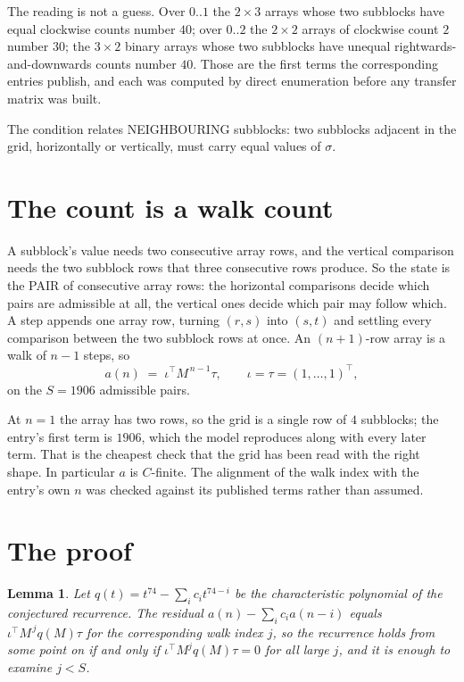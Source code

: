 \documentclass[11pt,a4paper]{article}
\theoremstyle{plain}
\newtheorem{lemma}[theorem]{Lemma}
\theoremstyle{definition}
\begin{document}
The reading is not a guess. Over $0..1$ the $2\times3$ arrays whose two subblocks have equal
clockwise counts number $40$; over $0..2$ the $2\times2$ arrays of clockwise count $2$ number
$30$; the $3\times2$ binary arrays whose two subblocks have unequal rightwards-and-downwards
counts number $40$. Those are the first terms the corresponding entries publish, and each was
computed by direct enumeration before any transfer matrix was built.

The condition relates NEIGHBOURING subblocks: two subblocks adjacent in the grid, horizontally
or vertically, must carry equal values of $\sigma$.

\section{The count is a walk count}

A subblock's value needs two consecutive array rows, and the vertical
comparison needs the two subblock rows that three consecutive rows produce. So the state is the
PAIR of consecutive array rows: the horizontal comparisons decide which pairs are admissible at
all, the vertical ones decide which pair may follow which. A step appends one array row,
turning $(r,s)$ into $(s,t)$ and settling every comparison between the two subblock rows at
once. An $(n+1)$-row array is a walk of $n-1$ steps, so
\[
a(n)\;=\;\iota^{\!\top}M^{\,n-1}\tau,\qquad\iota=\tau=(1,\dots,1)^{\!\top},
\]
on the $S=1906$ admissible pairs.

At $n=1$ the array has two rows, so the grid is a single row of $4$
subblocks; the entry's first term is $1906$, which the model
reproduces along with every later term. That is the cheapest check that the grid has been read
with the right shape.
In particular $a$ is $C$-finite. The alignment of the walk index with the entry's own $n$ was
checked against its published terms rather than assumed.

\section{The proof}

\begin{lemma}\label{lem:crit}
Let $q(t)=t^{74}-\sum_i c_it^{74-i}$ be the characteristic polynomial of the
conjectured recurrence. The residual $a(n)-\sum_ic_ia(n-i)$ equals
$\iota^{\!\top}M^{\,j}q(M)\tau$ for the corresponding walk index $j$, so the recurrence
holds from some point on if and only if $\iota^{\!\top}M^{j}q(M)\tau=0$ for all large $j$,
and it is enough to examine $j<S$.
\end{lemma}
\end{document}
